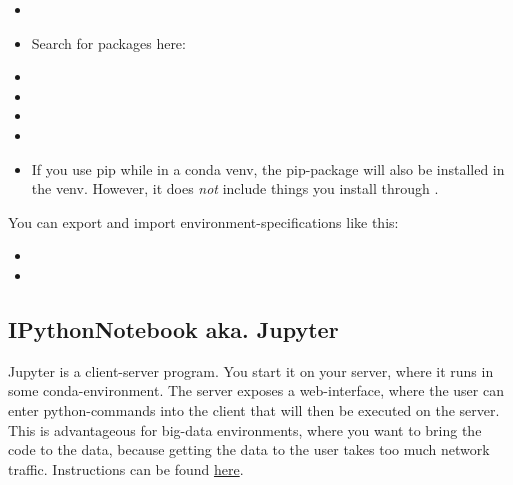 \begin{itemize}
    \item {}
    \item Search for packages here: 
    \item {}
    \item {}
    \item {}
    \item {}
    \item If you use pip while in a conda venv, the pip-package will also be installed in the venv. However, it does \emph{not} include things you install through .
\end{itemize}


You can export and import environment-specifications like this: 
\begin{itemize}
	\item {}
	\item {}
\end{itemize}


\subsection{IPythonNotebook aka. Jupyter}
Jupyter is a client-server program. You start it on your server, where it runs in some conda-environment. 
The server exposes a web-interface, where the user can enter python-commands into the client that will then be executed on the server. 
This is advantageous for big-data environments, where you want to bring the code to the data, because getting the data to the user takes too much network traffic. 
Instructions can be found \href{https://jupyter-notebook.readthedocs.io/en/stable/public_server.html}{here}.
